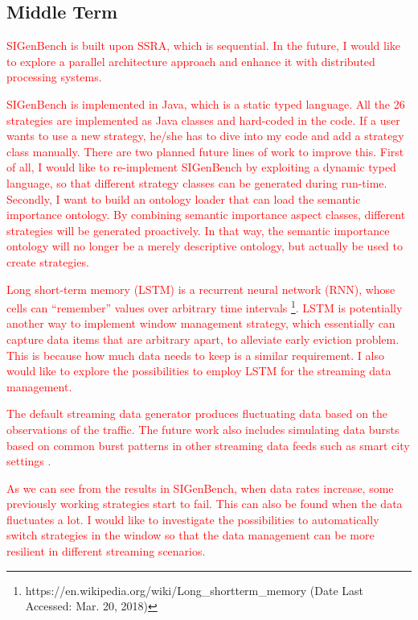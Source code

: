 \subsection{Middle Term}
\textcolor{red}{
SIGenBench is built upon SSRA, which is sequential.
In the future, I would like to explore a parallel architecture approach and enhance it with distributed processing systems.
}

\textcolor{red}{
SIGenBench is implemented in Java, which is a static typed language.
All the 26 strategies are implemented as Java classes and hard-coded in the code. 
If a user wants to use a new strategy, he/she has to dive into my code and add a strategy class manually. 
There are two planned future lines of work to improve this. 
First of all, I would like to re-implement SIGenBench by exploiting a dynamic typed language, so that different strategy classes can be generated during run-time. 
Secondly, I want to build an ontology loader that can load the semantic importance ontology.
By combining semantic importance aspect classes, different strategies will be generated proactively. 
In that way, the semantic importance ontology will no longer be a merely descriptive ontology, but actually be used to create strategies.
}

\textcolor{red}{
Long short-term memory (LSTM) \cite{DBLP:journals/neco/HochreiterS97} is a recurrent neural network (RNN), whose cells can ``remember'' values over arbitrary time intervals \footnote{https://en.wikipedia.org/wiki/Long\_short\-term\_memory (Date Last Accessed: Mar. 20, 2018)}.
LSTM is potentially another way to implement window management strategy, which essentially can capture data items that are arbitrary apart, to alleviate early eviction problem. 
This is because how much data needs to keep is a similar requirement. 
I also would like to explore the possibilities to employ LSTM for the streaming data management. 
}

\textcolor{red}{
The default streaming data generator produces fluctuating data based on the observations of the traffic. 
The future work also includes simulating data bursts based on common burst patterns in other streaming data feeds such as smart city settings \cite{tonjes2014real}.
}

\textcolor{red}{
As we can see from the results in SIGenBench, when data rates increase, some previously working strategies start to fail.
This can also be found when the data fluctuates a lot.
I would like to investigate the possibilities to automatically switch strategies in the window so that the data management can be more resilient in different streaming scenarios. 
}
%
